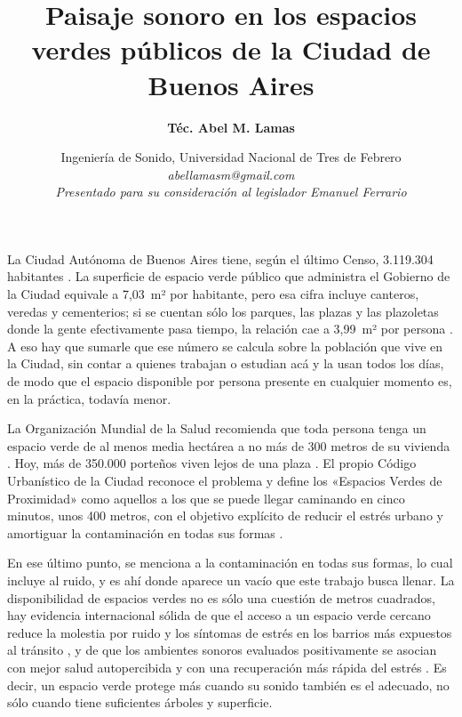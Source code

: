 \documentclass[11pt]{article}
\begin{document}
\title{\textbf{\Large{Paisaje sonoro en los espacios verdes públicos de la Ciudad de Buenos Aires}}}
\author{\textbf{Téc. Abel M. Lamas}\vspace{1ex}}
\date{\normalsize{Ingeniería de Sonido, Universidad Nacional de Tres de Febrero}\\
\textit{abellamasm@gmail.com}\\
\textit{Presentado para su consideración al legislador Emanuel Ferrario}\vspace{-1ex}}

\maketitle

La Ciudad Autónoma de Buenos Aires tiene, según el último Censo, 3.119.304 habitantes \parencite{indec2023}. La superficie de espacio verde público que administra el Gobierno de la Ciudad equivale a 7,03~m² por habitante, pero esa cifra incluye canteros, veredas y cementerios; si se cuentan sólo los parques, las plazas y las plazoletas donde la gente efectivamente pasa tiempo, la relación cae a 3,99~m² por persona \parencite{dgeyc2023}. A eso hay que sumarle que ese número se calcula sobre la población que vive en la Ciudad, sin contar a quienes trabajan o estudian acá y la usan todos los días, de modo que el espacio disponible por persona presente en cualquier momento es, en la práctica, todavía menor.

La Organización Mundial de la Salud recomienda que toda persona tenga un espacio verde de al menos media hectárea a no más de 300 metros de su vivienda \parencite{who2016}. Hoy, más de 350.000 porteños viven lejos de una plaza \parencite{gadea2021}. El propio Código Urbanístico de la Ciudad reconoce el problema y define los «Espacios Verdes de Proximidad» como aquellos a los que se puede llegar caminando en cinco minutos, unos 400 metros, con el objetivo explícito de reducir el estrés urbano y amortiguar la contaminación en todas sus formas \parencite[art.~10.12.8]{codigourbanistico}.

En ese último punto, se menciona a la contaminación en todas sus formas, lo cual incluye al ruido, y es ahí donde aparece un vacío que este trabajo busca llenar. La disponibilidad de espacios verdes no es sólo una cuestión de metros cuadrados, hay evidencia internacional sólida de que el acceso a un espacio verde cercano reduce la molestia por ruido y los síntomas de estrés en los barrios más expuestos al tránsito \parencite{gidlof2007}, y de que los ambientes sonoros evaluados positivamente se asocian con mejor salud autopercibida y con una recuperación más rápida del estrés \parencite{aletta2018}. Es decir, un espacio verde protege más cuando su sonido también es el adecuado, no sólo cuando tiene suficientes árboles y superficie.
\end{document}
